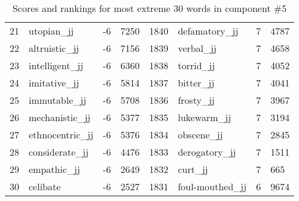 \begin{table}[tbp]
\begin{tabular}{| rlr@{.}l | rlr@{.}l |}
    21 & utopian\_jj & -6 & 7250    &    1840 & defamatory\_jj & 7 & 4787 \\
    22 & altruistic\_jj & -6 & 7156    &    1839 & verbal\_jj & 7 & 4658 \\
    23 & intelligent\_jj & -6 & 6360    &    1838 & torrid\_jj & 7 & 4052 \\
    24 & imitative\_jj & -6 & 5814    &    1837 & bitter\_jj & 7 & 4041 \\
    25 & immutable\_jj & -6 & 5708    &    1836 & frosty\_jj & 7 & 3967 \\
    26 & mechanistic\_jj & -6 & 5377    &    1835 & lukewarm\_jj & 7 & 3194 \\
    27 & ethnocentric\_jj & -6 & 5376    &    1834 & obscene\_jj & 7 & 2845 \\
    28 & considerate\_jj & -6 & 4476    &    1833 & derogatory\_jj & 7 & 1511 \\
    29 & empathic\_jj & -6 & 2649    &    1832 & curt\_jj & 7 & 665 \\
    30 & celibate & -6 & 2527    &    1831 & foul-mouthed\_jj & 6 & 9674 \\
    \hline
    \end{tabular}
    \caption{Scores and rankings for most extreme 30 words in component \#5} 
\end{table}
\clearpage
